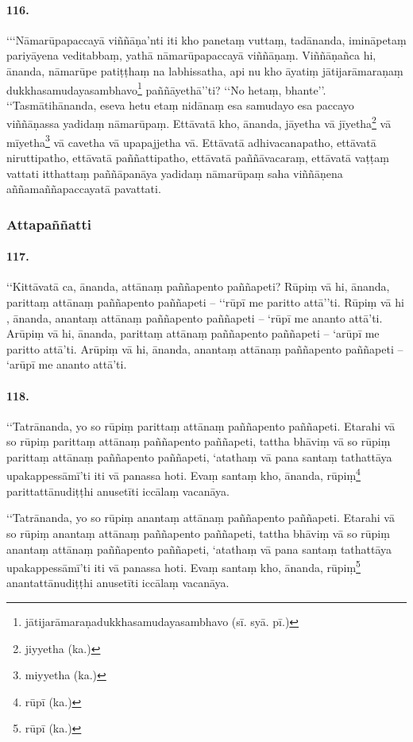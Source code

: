 \paragraph{116.} ‘‘‘Nāmarūpapaccayā viññāṇa’nti iti kho panetaṃ vuttaṃ, tadānanda, imināpetaṃ pariyāyena veditabbaṃ, yathā nāmarūpapaccayā viññāṇaṃ. Viññāṇañca hi, ānanda, nāmarūpe patiṭṭhaṃ na labhissatha, api nu kho āyatiṃ jātijarāmaraṇaṃ dukkhasamudayasambhavo\footnote{jātijarāmaraṇadukkhasamudayasambhavo (sī. syā. pī.)} paññāyethā’’ti? ‘‘No hetaṃ, bhante’’. ‘‘Tasmātihānanda, eseva hetu etaṃ nidānaṃ esa samudayo esa paccayo viññāṇassa yadidaṃ nāmarūpaṃ. Ettāvatā kho, ānanda, jāyetha vā jīyetha\footnote{jiyyetha (ka.)} vā mīyetha\footnote{miyyetha (ka.)} vā cavetha vā upapajjetha vā. Ettāvatā adhivacanapatho, ettāvatā niruttipatho, ettāvatā paññattipatho, ettāvatā paññāvacaraṃ, ettāvatā vaṭṭaṃ vattati itthattaṃ paññāpanāya yadidaṃ nāmarūpaṃ saha viññāṇena aññamaññapaccayatā pavattati.

\subsubsection{Attapaññatti}

\paragraph{117.} ‘‘Kittāvatā ca, ānanda, attānaṃ paññapento paññapeti? Rūpiṃ vā hi, ānanda, parittaṃ attānaṃ paññapento paññapeti – ‘‘rūpī me paritto attā’’ti. Rūpiṃ vā hi , ānanda, anantaṃ attānaṃ paññapento paññapeti – ‘rūpī me ananto attā’ti. Arūpiṃ vā hi, ānanda, parittaṃ attānaṃ paññapento paññapeti – ‘arūpī me paritto attā’ti. Arūpiṃ vā hi, ānanda, anantaṃ attānaṃ paññapento paññapeti – ‘arūpī me ananto attā’ti.

\paragraph{118.} ‘‘Tatrānanda, yo so rūpiṃ parittaṃ attānaṃ paññapento paññapeti. Etarahi vā so rūpiṃ parittaṃ attānaṃ paññapento paññapeti, tattha bhāviṃ vā so rūpiṃ parittaṃ attānaṃ paññapento paññapeti, ‘atathaṃ vā pana santaṃ tathattāya upakappessāmī’ti iti vā panassa hoti. Evaṃ santaṃ kho, ānanda, rūpiṃ\footnote{rūpī (ka.)} parittattānudiṭṭhi anusetīti iccālaṃ vacanāya.

‘‘Tatrānanda, yo so rūpiṃ anantaṃ attānaṃ paññapento paññapeti. Etarahi vā so rūpiṃ anantaṃ attānaṃ paññapento paññapeti, tattha bhāviṃ vā so rūpiṃ anantaṃ attānaṃ paññapento paññapeti, ‘atathaṃ vā pana santaṃ tathattāya upakappessāmī’ti iti vā panassa hoti. Evaṃ santaṃ kho, ānanda, rūpiṃ\footnote{rūpī (ka.)} anantattānudiṭṭhi anusetīti iccālaṃ vacanāya.

